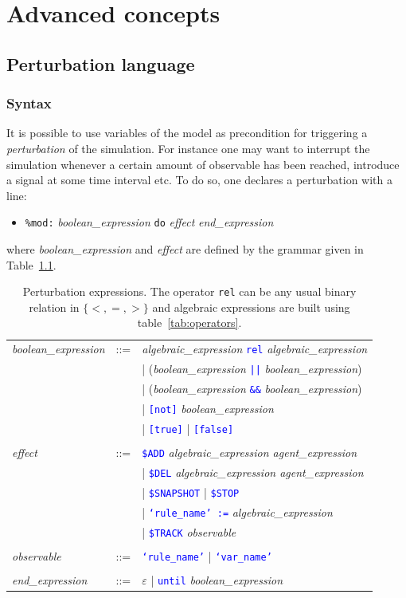\documentclass[11pt]{book}
\def\tcb#1{\textcolor{blue}{\ttt{#1}}}
\def\ttt#1{\texttt{#1}}
\def\set#1{\{#1\}}
\def\ITE#1{\begin{itemize}#1\end{itemize}}
\begin{document}
\chapter{Advanced concepts}\label{chap:advanced}

\section{Perturbation language}\label{sec:mod}

\subsection{Syntax} 
It is possible to use variables of the model as precondition for triggering a \emph{perturbation} of the simulation. For instance one may want to interrupt the simulation whenever a certain amount of observable has been reached, introduce a signal at some time interval etc. To do so, one declares a perturbation with a line:
\ITE{
\item[] \ttt{\%mod:} \textit{boolean\_expression} \ttt{do} \textit{effect} \textit{end\_expression}
}
where \textit{boolean\_expression} and \textit{effect} are defined by the grammar given in Table~\ref{tab:pert}.
\begin{table}[htbp]
  \centering
  \begin{tabular}{@{} lcl @{}}
    \textit{boolean\_expression} &::=& \textit{algebraic\_expression}\index{boolean expression} \tcb{rel} \textit{algebraic\_expression} \\
    && | (\textit{boolean\_expression} \tcb{||} \textit{boolean\_expression}) \\
    && | (\textit{boolean\_expression} \tcb{\&\&} \textit{boolean\_expression}) \\
    && | \tcb{[not]} \textit{boolean\_expression} \\
    && | \tcb{[true]} | \tcb{[false]} \\\\
    \textit{effect} &::=& \tcb{\$ADD} \textit{algebraic\_expression agent\_expression} \\
    && | \tcb{\$DEL} \textit{algebraic\_expression agent\_expression} \\
    && | \tcb{\$SNAPSHOT} | \tcb{\$STOP} \\ && | \tcb{`rule\_name' :=} \textit{algebraic\_expression} \\
    && | \tcb{\$TRACK} \textit{observable} \\\\
    \textit{observable} &::=& \tcb{`rule\_name'} | \tcb{`var\_name'} \\\\
    \textit{end\_expression} &::=& $\varepsilon$ | \tcb{until} \textit{boolean\_expression}
    \end{tabular}
  \caption{Perturbation expressions. The operator \ttt{rel} can be any usual binary relation in $\set{<,=,>}$ and algebraic expressions are built using table~\ref{tab:operators}.}
  \label{tab:pert}
\end{table}
\end{document}
